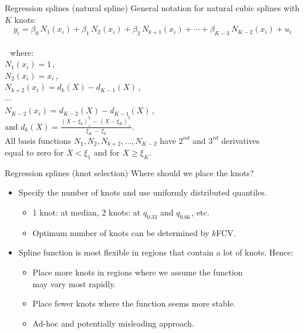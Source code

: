 \documentclass{beamer}
\begin{document}
\begin{frame}{Regression splines (natural spline)}
General notation for natural cubic splines with $K$ knots:
$$y_i = \beta_0 \, N_1 (x_i)  + \beta_1 \, N_2 (x_i) + \beta_2 \, N_{k+1} (x_i) + \cdots + \beta_{K-3} \, N_{K-2} (x_i) + u_i  $$\\
\vspace{-0.2cm}
~\,where:\\
\smallskip
\qquad $N_1 (x_i) = 1$\,,\\
\smallskip
\qquad $N_2 (x_i) = x_i$\,,\\
\smallskip
\qquad $N_{k+2} (x_i) = d_k(X)-d_{K-1}(X)\,$,\\
\qquad $\cdots$\\
\qquad $N_{K-2} (x_i) = d_{K-2}(X)-d_{K-1}(X)\,$,\\
\bigskip
\qquad and $d_k(X)=\frac{(X-\xi_k)_{+}^3 - \, (X-\xi_K)_{+}^3}{\xi_K \,-\, \xi_k}$.\\
\bigskip
All basis functions $N_1,N_2,N_{k+2},\dots,N_{K-2}$ have $2^{nd}$ and $3^{rd}$ derivatives \\equal to zero for $X < \xi_1$ and for $X \geq \xi_K$.
\end{frame}
\begin{frame}{Regression splines (knot selection)}
Where should we place the knots?\\
\bigskip
\begin{itemize}
    \item Specify the number of knots and use uniformly distributed quantiles.\\
    \medskip    
    \begin{itemize}
        \item 1 knot: at median, 2 knots: at $q_{0.33}$ and $q_{0.66\,}$, etc.
        \smallskip
        \item Optimum number of knots can be determined by $k$FCV.
    \end{itemize}
    \bigskip
    \item Spline function is most flexible in regions that contain a lot of knots. Hence:\\
    \medskip    
    \begin{itemize}
        \item Place more knots in regions where we assume the function \\may vary most rapidly.
        \smallskip
        \item Place fewer knots where the function seems more stable.
        \smallskip
        \item Ad-hoc and potentially misleading approach.
    \end{itemize}
\end{itemize}
\end{frame}
\end{document}
